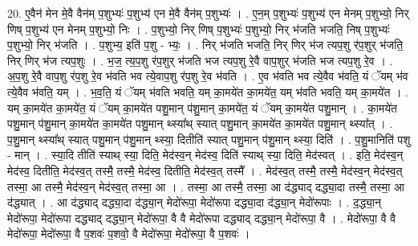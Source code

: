 \documentclass[17pt]{extarticle}
\begin{document}
20. ए॒वैन॑ मेन मे॒वै वैन॑म् प॒शुभ्यः॑ प॒शुभ्य॑ एन मे॒वै वैन॑म् प॒शुभ्यः॑ । . ए॒न॒म् प॒शुभ्यः॑ प॒शुभ्य॑ एन मेनम् प॒शुभ्यो॒ निर् णिष् प॒शुभ्य॑ एन मेनम् प॒शुभ्यो॒ निः । . प॒शुभ्यो॒ निर् णिष् प॒शुभ्यः॑ प॒शुभ्यो॒ निर् भ॑जति भजति॒ निष् प॒शुभ्यः॑ प॒शुभ्यो॒ निर् भ॑जति । . प॒शुभ्य॒ इति॑ प॒शु - भ्यः॒ । . निर् भ॑जति भजति॒ निर् णिर् भ॑ज त्यप॒शु र॑प॒शुर् भ॑जति॒ निर् णिर् भ॑ज त्यप॒शुः । . भ॒ज॒ त्य॒प॒शु र॑प॒शुर् भ॑जति भज त्यप॒शु रे॒वै वाप॒शुर् भ॑जति भज त्यप॒शु रे॒व । . अ॒प॒शु रे॒वै वाप॒शु र॑प॒शु रे॒व भ॑वति भव त्ये॒वाप॒शु र॑प॒शु रे॒व भ॑वति । . ए॒व भ॑वति भव त्ये॒वैव भ॑वति॒ यं ॅयम् भ॑व त्ये॒वैव भ॑वति॒ यम् । . भ॒व॒ति॒ यं ॅयम् भ॑वति भवति॒ यम् का॒मये॑त का॒मये॑त॒ यम् भ॑वति भवति॒ यम् का॒मये॑त । . यम् का॒मये॑त का॒मये॑त॒ यं ॅयम् का॒मये॑त पशु॒मान् प॑शु॒मान् का॒मये॑त॒ यं ॅयम् का॒मये॑त पशु॒मान् । . का॒मये॑त पशु॒मान् प॑शु॒मान् का॒मये॑त का॒मये॑त पशु॒मान् थ्स्या᳚थ् स्यात् पशु॒मान् का॒मये॑त का॒मये॑त पशु॒मान् थ्स्या᳚त् । . प॒शु॒मान् थ्स्या᳚थ् स्यात् पशु॒मान् प॑शु॒मान् थ्स्या॒ दितीति॑ स्यात् पशु॒मान् प॑शु॒मान् थ्स्या॒ दिति॑ । . प॒शु॒मानिति॑ पशु - मान् । . स्या॒दि तीति॑ स्याथ् स्या॒ दिति॒ मेद॑स्व॒न् मेद॑स्व॒ दिति॑ स्याथ् स्या॒ दिति॒ मेद॑स्वत् । . इति॒ मेद॑स्व॒न् मेद॑स्व॒ दितीति॒ मेद॑स्व॒त् तस्मै॒ तस्मै॒ मेद॑स्व॒ दितीति॒ मेद॑स्व॒त् तस्मै᳚ । . मेद॑स्व॒त् तस्मै॒ तस्मै॒ मेद॑स्व॒न् मेद॑स्व॒त् तस्मा॒ आ तस्मै॒ मेद॑स्व॒न् मेद॑स्व॒त् तस्मा॒ आ । . तस्मा॒ आ तस्मै॒ तस्मा॒ आ द॑द्ध्याद् दद्ध्या॒दा तस्मै॒ तस्मा॒ आ द॑द्ध्यात् । . आ द॑द्ध्याद् दद्ध्या॒दा द॑द्ध्या॒न् मेदो॑रूपा॒ मेदो॑रूपा दद्ध्या॒दा द॑द्ध्या॒न् मेदो॑रूपाः । . द॒द्ध्या॒न् मेदो॑रूपा॒ मेदो॑रूपा दद्ध्याद् दद्ध्या॒न् मेदो॑रूपा॒ वै वै मेदो॑रूपा दद्ध्याद् दद्ध्या॒न् मेदो॑रूपा॒ वै । . मेदो॑रूपा॒ वै वै मेदो॑रूपा॒ मेदो॑रूपा॒ वै प॒शवः॑ प॒शवो॒ वै मेदो॑रूपा॒ मेदो॑रूपा॒ वै प॒शवः॑ । \newline
\end{document}
